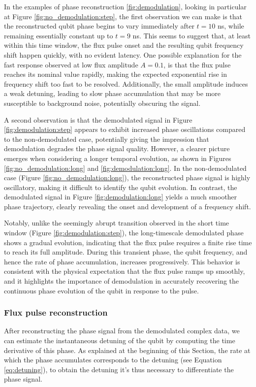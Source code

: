 In the examples of phase reconstruction \ref{fig:demodulation}, looking in particular at Figure \ref{fig:no_demodulation:step}, the first observation we can make is that the reconstructed qubit phase begins to vary immediately after $t=10$ ns, while remaining essentially constant up to $t=9$ ns. 
This seems to suggest that, at least within this time window, the flux pulse onset and the resulting qubit frequency shift happen quickly, with no evident latency.
One possible explanation for the fast response observed at low flux amplitude $A = 0.1$, is that the flux pulse reaches its nominal value rapidly, making the expected exponential rise in frequency shift too fast to be resolved. 
Additionally, the small amplitude induces a weak detuning, leading to slow phase accumulation that may be more susceptible to background noise, potentially obscuring the signal.

A second observation is that the demodulated signal in Figure \ref{fig:demodulation:step} appears to exhibit increased phase oscillations compared to the non-demodulated case, potentially giving the impression that demodulation degrades the phase signal quality. 
However, a clearer picture emerges when considering a longer temporal evolution, as shown in Figures \ref{fig:no_demodulation:long} and \ref{fig:demodulation:long}. 
In the non-demodulated case (Figure \ref{fig:no_demodulation:long}), the reconstructed phase signal is highly oscillatory, making it difficult to identify the qubit evolution. 
In contrast, the demodulated signal in Figure \ref{fig:demodulation:long} yields a much smoother phase trajectory, clearly revealing the onset and development of a frequency shift.

Notably, unlike the seemingly abrupt transition observed in the short time window (Figure \ref{fig:demodulation:step}), the long-timescale demodulated phase shows a gradual evolution, indicating that the flux pulse requires a finite rise time to reach its full amplitude. 
During this transient phase, the qubit frequency, and hence the rate of phase accumulation, increases progressively. 
This behavior is consistent with the physical expectation that the flux pulse ramps up smoothly, and it highlights the importance of demodulation in accurately recovering the continuous phase evolution of the qubit in response to the pulse.

\subsubsection{Flux pulse reconstruction}\label{subsec:WL}
After reconstructing the phase signal from the demodulated complex data, we can estimate the instantaneous detuning of the qubit by computing the time derivative of this phase. 
As explained at the beginning of this Section, the rate at which the phase accumulates corresponds to the detuning (see Equation \ref{eq:detuning}), to obtain the detuning it's thus necessary to differentiate the phase signal. 

